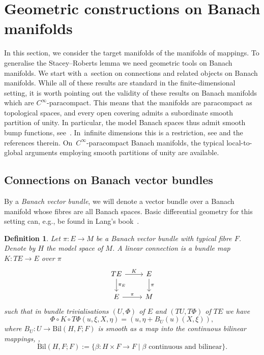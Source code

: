 \documentclass[pdftex]{sigma}
\numberwithin{equation}{section}
\newtheorem{Definition}[Theorem]{Definition}
\begin{document}
\section{Geometric constructions on Banach manifolds}

In this section, we consider the target manifolds of the manifolds of mappings. To generalise the Stacey--Roberts lemma we need geometric tools on Banach manifolds.
We start with a~section on connections and related objects on Banach manifolds.
While all of these results are standard in the finite-dimensional setting, it is worth pointing out the validity of these results on Banach manifolds which are $C^\infty$-paracompact.
This means that the manifolds are paracompact as topological spaces, and every open covering admits a subordinate smooth partition of unity. In particular, the model Banach spaces thus admit smooth bump functions, see~\cite{BaF66}.
In~infinite dimensions this is a restriction, see \cite[Appendix~A.4]{Sch23} and the references therein. On~$C^\infty$-paracompact Banach manifolds, the typical local-to-global arguments employing smooth partitions of unity are available.

\subsection{Connections on Banach vector bundles}

By a \emph{Banach vector bundle}, we will denote a vector bundle over a Banach manifold whose fibres are all Banach spaces. Basic differential geometry for this setting can, e.g., be found in Lang's book~\cite{La01}.


\begin{Definition}\label{defn:connect_lin}
Let $\pi \colon E \rightarrow M$ be a Banach vector bundle with typical fibre $F$. Denote by $H$ the model space of $M$. A \emph{linear connection} is a bundle map $K \colon TE \rightarrow E$ over $\pi$
\begin{displaymath}\begin{tikzcd}
TE \arrow[r,"K"]\arrow[d,"\pi_E"] & E \arrow[d,"\pi"]\\
E \arrow[r,"\pi"] & M
\end{tikzcd}\end{displaymath}
such that in bundle trivialisations $(U,\Phi)$ of $E$ and $(TU,T\Phi)$ of $TE$ we have \begin{displaymath}\Phi \circ K\circ T\Phi(u,\xi, X, \eta) = (u,\eta + B_U (u)(X,\xi)),\end{displaymath} where $B_U \colon U \rightarrow \mathrm{Bil} (H,F;F)$ is smooth as a map into the continuous bilinear mappings, \mbox{\cite[Definition 1.5.9]{Kli95}}, \begin{displaymath}
 \mathrm{Bil}(H,F;F) := \{\beta \colon H \times F \rightarrow F \mid \beta \text{ continuous and bilinear}\}.
\end{displaymath}
\end{Definition}
\end{document}
